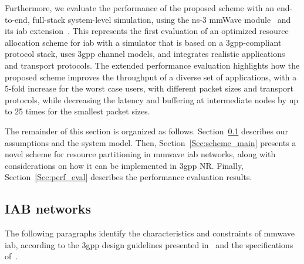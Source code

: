 Furthermore, we evaluate the performance of the proposed scheme with an end-to-end, full-stack system-level simulation, using the ns-3 mmWave module~\cite{mezzavilla2018end} and its \gls{iab} extension~\cite{polese2018end}. This represents the first evaluation of an optimized resource allocation scheme for \gls{iab} with a simulator that is based on a \gls{3gpp}-compliant protocol stack, uses \gls{3gpp} channel models, and integrates realistic applications and transport protocols. The extended performance evaluation highlights how the proposed scheme improves the throughput of a diverse set of applications, with a 5-fold increase for the worst case users, with different packet sizes and transport protocols, while decreasing the latency and buffering at intermediate nodes by up to 25 times for the smallest packet sizes.

The remainder of this section is organized as follows. Section~\ref{Sec:Sys-model} describes our assumptions and the system model. Then, Section~\ref{Sec:scheme_main} presents a novel scheme for resource partitioning in \gls{mmwave} \gls{iab} networks, along with considerations on how it can be implemented in \gls{3gpp} NR. Finally, Section~\ref{Sec:perf_eval} describes the performance evaluation results.

\subsection{IAB networks}
\label{Sec:Sys-model}

The following paragraphs identify the characteristics and constraints of \gls{mmwave} \gls{iab}, according to the \gls{3gpp} design guidelines presented in~\cite{3gpp_38_874} and the specifications of~\cite{3gpp_38_174}.

